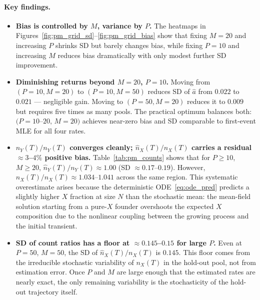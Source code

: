 \documentclass[12pt]{article}
\begin{document}
\paragraph{Key findings.}
\begin{itemize}
  \item \textbf{Bias is controlled by $M$, variance by $P$.}
        The heatmaps in Figures~\ref{fig:pm_grid_sd}--\ref{fig:pm_grid_bias}
        show that fixing $M=20$ and increasing $P$ shrinks SD but barely
        changes bias, while fixing $P=10$ and increasing $M$ reduces bias
        dramatically with only modest further SD improvement.

  \item \textbf{Diminishing returns beyond $M=20$, $P=10$.}
        Moving from $(P=10,M=20)$ to $(P=10,M=50)$ reduces SD of $\hat{a}$
        from $0.022$ to $0.021$ — negligible gain.  Moving to $(P=50, M=20)$
        reduces it to $0.009$ but requires five times as many pools.
        The practical optimum balances both: $(P=10$--$20,\, M=20)$ achieves
        near-zero bias and SD comparable to first-event MLE for all four rates.

  \item \textbf{$\hat{n}_Y(T)/n_Y(T)$ converges cleanly; $\hat{n}_X(T)/n_X(T)$
        carries a residual ${\approx}3$--$4\%$ positive bias.}
        Table~\ref{tab:pm_counts} shows that for $P \ge 10$, $M \ge 20$,
        $\hat{n}_Y(T)/n_Y(T) \approx 1.00$ (SD $\approx 0.17$--$0.19$).
        However, $\hat{n}_X(T)/n_X(T) \approx 1.034$--$1.041$ across the
        same region.  This systematic overestimate arises because the
        deterministic ODE~\eqref{eq:ode_pred} predicts a slightly higher $X$
        fraction at size $N$ than the stochastic mean: the mean-field solution
        starting from a pure-$X$ founder overshoots the expected $X$
        composition due to the nonlinear coupling between the growing process
        and the initial transient.

  \item \textbf{SD of count ratios has a floor at ${\approx}0.145$--$0.15$
        for large $P$.}
        Even at $P=50$, $M=50$, the SD of $\hat{n}_X(T)/n_X(T)$ is $0.145$.
        This floor comes from the irreducible stochastic variability of
        $n_X(T)$ in the hold-out pool, not from estimation error.  Once $P$
        and $M$ are large enough that the estimated rates are nearly exact,
        the only remaining variability is the stochasticity of the hold-out
        trajectory itself.
\end{itemize}
\end{document}
